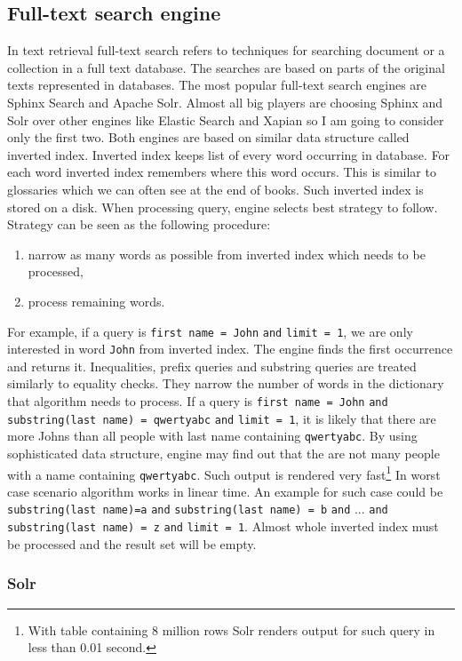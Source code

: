 \documentclass[10pt,a4paper]{article}
\begin{document}
\subsection{Full-text search engine}
In text retrieval full-text search refers to techniques for searching document or a collection in a full text database. The searches are based on parts of the original texts represented in databases. The most popular full-text search engines are Sphinx Search and Apache Solr. Almost all big players are choosing Sphinx and Solr over other engines like Elastic Search and Xapian so I am going to consider only the first two. Both engines are based on similar data structure called inverted index. Inverted index keeps list of every word occurring in database. For each word inverted index remembers where this word occurs. This is similar to glossaries which we can often see at the end of books. Such inverted index is stored on a disk. When processing query, engine selects best strategy to follow. Strategy can be seen as the following procedure:
\begin{enumerate}
\item narrow as many words as possible from inverted index which needs to be processed, 
\item process remaining words. 
\end{enumerate}
For example, if a query is \verb|first name = John| \verb|and| \verb|limit = 1|, we are only interested in word \verb|John| from inverted index. The engine finds the first occurrence and returns it. Inequalities, prefix queries and substring queries are treated similarly to equality checks. They narrow the number of words in the dictionary that algorithm needs to process. If a query is \verb|first name = John| \verb|and| \verb|substring(last name) = qwertyabc| \verb|and| \verb|limit = 1|, it is likely that there are more Johns than all people with last name containing \verb|qwertyabc|. By using sophisticated data structure, engine may find out that the are not many people with a name containing \verb|qwertyabc|. Such output is rendered very fast\footnote{With table containing 8 million rows Solr renders output for such query in less than 0.01 second.} In worst case scenario algorithm works in linear time. An example for such case could be \verb|substring(last name)=a| \verb|and| \verb|substring(last name) = b| \verb|and| ... \verb|and| \verb|substring(last name) = z| \verb|and| \verb|limit = 1|. Almost whole inverted index must be processed and the result set will be empty.

\subsubsection{Solr}
\end{document}

